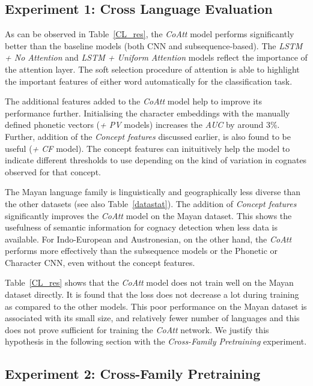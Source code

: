 \documentclass[11pt,letterpaper]{article}
\begin{document}
\subsection{Experiment 1: Cross Language Evaluation}

As can be observed in Table~\ref{CL_res}, the \textit{CoAtt} model performs significantly better than the baseline models (both CNN and subsequence-based). The \textit{LSTM + No Attention} and \textit{LSTM + Uniform Attention} models reflect the importance of the attention layer. The soft selection procedure of attention is able to highlight the important features of either word automatically for the classification task.  

The additional features added to the \textit{CoAtt} model help to improve its performance further. Initialising the character embeddings with the manually defined phonetic vectors (\textit{+ PV} models) increases the \textit{AUC} by around 3\%. Further, addition of the \textit{Concept features} discussed earlier, is also found to be useful (\textit{+ CF} model). The concept features can inituitively help the model to indicate different thresholds to use depending on the kind of variation in cognates observed for that concept. 

The Mayan language family is linguistically and geographically less diverse than the other datasets (see also Table~\ref{datastat}). The addition of \textit{Concept features} significantly improves the \textit{CoAtt} model on the Mayan dataset. This shows the usefulness of semantic information for cognacy detection when less data is available. For Indo-European and Austronesian, on the other hand, the \textit{CoAtt} performs more effectively than the subsequence models or the Phonetic or Character CNN, even without the concept features. 

Table~\ref{CL_res} shows that the \textit{CoAtt} model does not train well on the Mayan dataset directly. It is found that the loss does not decrease a lot during training as compared to the other models. This poor performance on the Mayan dataset is associated with its small size, and relatively fewer number of languages and this does not prove sufficient for training the \textit{CoAtt} network. 
We justify this hypothesis in the following section with the \textit{Cross-Family Pretraining} experiment.

\subsection{Experiment 2: Cross-Family Pretraining}
\end{document}
